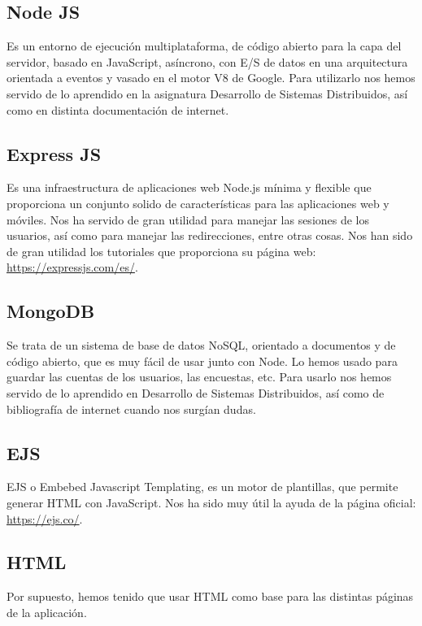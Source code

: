 \documentclass{article}
\begin{document}
 	\subsection{Node JS}
 	Es un entorno de ejecución multiplataforma, de código abierto para la capa del servidor, basado en JavaScript, asíncrono, con E/S de datos en una arquitectura orientada a eventos y vasado en el motor V8 de Google. Para utilizarlo nos hemos servido de lo aprendido en la asignatura Desarrollo de Sistemas Distribuidos, así como en distinta documentación de internet.
 	\subsection{Express JS}
 	Es una infraestructura de aplicaciones web Node.js mínima y flexible que proporciona un conjunto solido de características para las aplicaciones web y móviles. Nos ha servido de gran utilidad para manejar las sesiones de los usuarios, así como para manejar las redirecciones, entre otras cosas. Nos han sido de gran utilidad los tutoriales que proporciona su página web: \url{https://expressjs.com/es/}.
 	\subsection{MongoDB}
 	Se trata de un sistema de base de datos NoSQL, orientado a documentos y de código abierto, que es muy fácil de usar junto con Node. Lo hemos usado para guardar las cuentas de los usuarios, las encuestas, etc. Para usarlo nos hemos servido de lo aprendido en Desarrollo de Sistemas Distribuidos, así como de bibliografía de internet cuando nos surgían dudas.
 	\subsection{EJS}
 	EJS o Embebed Javascript Templating, es un motor de plantillas, que permite generar HTML con JavaScript. Nos ha sido muy útil la ayuda de la página oficial: \url{https://ejs.co/}.
 	\subsection{HTML}
 	Por supuesto, hemos tenido que usar HTML como base para las distintas páginas de la aplicación.
 	
\end{document}
